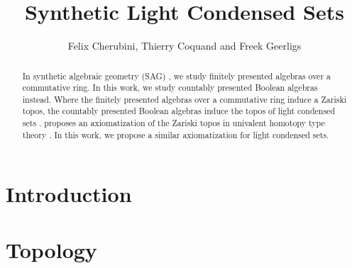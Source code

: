 \documentclass{../util/zariski-small}
\title{Synthetic Light Condensed Sets}
\theoremstyle{break}
\begin{document}
\author{Felix Cherubini, Thierry Coquand and Freek Geerligs}

\maketitle

\begin{abstract}
In synthetic algebraic geometry (SAG) \cite{draft}, we study finitely presented algebras over a commutative ring. 
In this work, we study countably presented Boolean algebras instead. 
Where the finitely presented algebras over a commutative ring induce a Zariski topos, 
the countably presented Boolean algebras induce the topos of light condensed sets \cite{Scholze}. 
\cite{draft} proposes an axiomatization of the Zariski topos in univalent homotopy type theory \cite{hott}. 
In this work, we propose a similar axiomatization for light condensed sets. 
\end{abstract} 

\section*{Introduction}


\section{Topology}



\printbibliography
\end{document}
